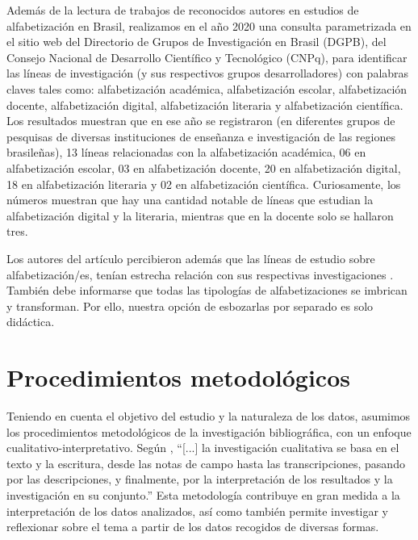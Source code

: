 \documentclass[spanish]{textolivre}
\begin{document}
Además de la lectura de trabajos de reconocidos autores en estudios de alfabetización en Brasil, realizamos en el año 2020 una consulta parametrizada en el sitio web del Directorio de Grupos de Investigación en Brasil (DGPB), del Consejo Nacional de Desarrollo Científico y Tecnológico (CNPq), para identificar las líneas de investigación (y sus respectivos grupos desarrolladores) con palabras claves tales como: alfabetización académica, alfabetización escolar, alfabetización docente, alfabetización digital, alfabetización literaria y alfabetización científica. Los resultados muestran que en ese año se registraron (en diferentes grupos de pesquisas de diversas instituciones de enseñanza e investigación de las regiones brasileñas), 13 líneas relacionadas con la alfabetización académica, 06 en alfabetización escolar, 03 en alfabetización docente, 20 en alfabetización digital, 18 en alfabetización literaria y 02 en alfabetización científica. Curiosamente, los números muestran que hay una cantidad notable de líneas que estudian la alfabetización digital y la literaria, mientras que en la docente solo se hallaron tres.

Los autores del artículo percibieron además que las líneas de estudio sobre alfabetización/es, tenían estrecha relación con sus respectivas investigaciones \cite{goncalves_nas_2011, goncalves_interacao_2013, silva_pedagogia_2018, silva_formacao_2019, silva_plano_2020, santos_letramento_2020}. También debe informarse que todas las tipologías de alfabetizaciones se imbrican y transforman. Por ello, nuestra opción de esbozarlas por separado es solo didáctica.

\section{Procedimientos metodológicos}\label{sec-metodologia}
Teniendo en cuenta el objetivo del estudio y la naturaleza de los datos, asumimos los procedimientos metodológicos de la investigación bibliográfica, con un enfoque cualitativo-interpretativo. Según \textcite[p. 9]{flick_introduco_2009}, “[...] la investigación cualitativa se basa en el texto y la escritura, desde las notas de campo hasta las transcripciones, pasando por las descripciones, y finalmente, por la interpretación de los resultados y la investigación en su conjunto.” Esta metodología contribuye en gran medida a la interpretación de los datos analizados, así como también permite investigar y reflexionar sobre el tema a partir de los datos recogidos de diversas formas.
\end{document}
